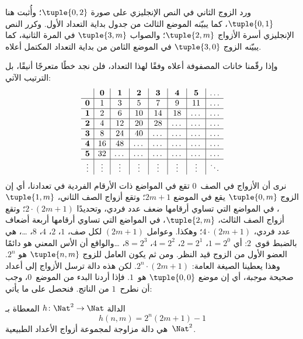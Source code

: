 \documentclass[../../../include/open-logic-section]{subfiles}
\begin{document}
\begin{explain}
\begin{editorial}
ورد الزوج الثاني في النص الإنجليزي على صورة $\tuple{0,2}$؛ وأُثبت هنا
$\tuple{0,1}$، كما يبيّنه الموضع الثالث من جدول بداية التعداد الأول.
وكرر النص الإنجليزي أسرة الأزواج $\tuple{2,m}$؛ والصواب
$\tuple{3,m}$ في المرة الثانية، كما يبيّنه الزوج $\tuple{3,0}$
في الموضع الثامن من بداية التعداد المكتمل أعلاه.
\end{editorial}
وإذا رقّمنا خانات المصفوفة أعلاه وفقًا لهذا التعداد، فلن نجد خطًا
متعرجًا أنيقًا، بل الترتيب الآتي:
\[
\begin{array}{ c | c | c | c | c | c | c | c }
& \mathbf 0 & \mathbf 1 & \mathbf 2 & \mathbf 3 & \mathbf 4 & \mathbf 5 & \dots \\
\hline
\mathbf 0 & 1 & 3 & 5 & 7 & 9 & 11 & \dots \\
\hline
\mathbf 1 & 2 & 6 & 10 & 14 & 18 & \dots & \dots \\
\hline
\mathbf 2 & 4 & 12 & 20 & 28 & \dots & \dots & \dots \\
\hline
\mathbf 3 & 8 & 24 & 40 & \dots & \dots & \dots & \dots \\
\hline
\mathbf 4 & 16 & 48 & \dots & \dots & \dots & \dots & \dots \\
\hline
\mathbf 5 & 32 & \dots & \dots & \dots & \dots & \dots & \dots \\
\hline
\vdots & \vdots & \vdots & \vdots & \vdots & \vdots & \vdots & \ddots\\
\end{array}
\]
نرى أن الأزواج في الصف~$0$ تقع في المواضع ذات الأرقام الفردية في
تعدادنا، أي إن الزوج $\tuple{0,m}$ يقع في الموضع $2m+1$؛ وتقع أزواج
الصف الثاني، $\tuple{1,m}$، في المواضع التي تساوي أرقامها ضعف عدد
فردي، وتحديدًا $2 \cdot (2m+1)$؛ وتقع أزواج الصف الثالث،
$\tuple{2,m}$، في المواضع التي تساوي أرقامها أربعة أضعاف عدد فردي،
$4 \cdot (2m+1)$؛ وهكذا. وعوامل $(2m+1)$ لكل صف، $1$، $2$، $4$،
$8$، \dots، هي بالضبط قوى~$2$: أي $1= 2^0$، $2 = 2^1$،
$4 = 2^2$، $8 = 2^3$، \dots\@ والواقع أن الأس المعني هو دائمًا
العضو الأول من الزوج قيد النظر. ومن ثم يكون العامل للزوج
$\tuple{n,m}$ هو $2^n$. وهذا يعطينا الصيغة العامة:
$2^n \cdot (2m+1)$. لكن هذه دالة ترسل الأزواج إلى أعداد صحيحة
\emph{موجبة}، أي إن موضع $\tuple{0,0}$ هو~$1$. فإذا أردنا البدء من
الموضع~$0$، وجب أن نطرح~$1$ من الناتج. فنحصل على ما يأتي:
\end{explain}

\begin{ex}
الدالة $h\colon \Nat^2 \to \Nat$ المعطاة بـ
\[
h(n,m) = 2^n (2m+1) - 1
\]
هي دالة مزاوجة لمجموعة أزواج الأعداد الطبيعية~$\Nat^2$.
\end{ex}
\end{document}
